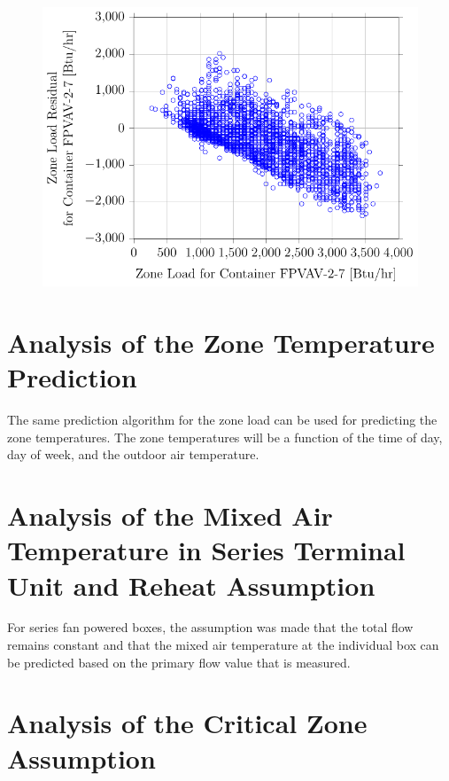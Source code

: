 \begin{figure}
\centering
\includegraphics[]{Plots/2016-09-14-1020-ZoneLoadResidualforContainerFPVAV27vsZoneLoadforContainerFPVAV27.pdf}
\caption{  }
\label{fig:2016-09-14-1020-ZoneLoadResidualforContainerFPVAV27vsZoneLoadforContainerFPVAV27}
\end{figure}

\section{Analysis of the Zone Temperature Prediction} 

The same prediction algorithm for the zone load can be used for predicting the zone temperatures. The zone temperatures will be a function of the time of day, day of week, and the outdoor air temperature. 


\section{Analysis of the Mixed Air Temperature in Series Terminal Unit and Reheat Assumption}

For series fan powered boxes, the assumption was made that the total flow remains constant and that the mixed air temperature at the individual box can be predicted based on the primary flow value that is measured. 


\section{Analysis of the Critical Zone Assumption}

